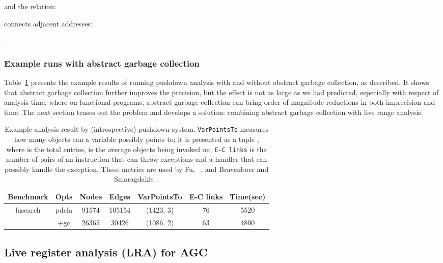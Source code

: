   and the relation:
  
  connects adjacent addresses: 
 
  .

  
\subsubsection{Example runs with abstract garbage collection}



Table~\ref{tbl:to-lead-lra} presents the example results of running pushdown analysis with and without abstract garbage collection,
as described.
It shows that abstract garbage collection further improves the precision, but the effect  is not as large as we had predicted,
especially with respect of analysis time, where on functional programs, abstract garbage collection can bring order-of-magnitude 
reductions in both  imprecision and time.
The next section teases out the problem and develops a solution: combining abstract garbage collection 
with live range analysis.


\begin{table}
    \begin{tabular}{ c | c | c | c | c | c | c }
    \textbf{Benchmark} & \textbf{Opts} & \textbf{Nodes} & \textbf{Edges} &  \textbf{VarPointsTo} & \textbf{E-C links} & \textbf{Time(sec)} \\ \hline 
          \multirow{2}{*}{lusearch} & pdcfa & 91574  & 105154  &  (1423, 3) &  76  &  5520 
          \\ & +gc  & 26365  & 30426  &  (1086, 2) &  63 & 4800 
         \\
     \hline
    \end{tabular}    
     \caption{Example analysis result by (introspective) pushdown system.
     {\tt{VarPointsTo}} measures how many objects can a variable possibly points to; 
     it is   presented as a tuple , where  is the total entries,  is the average 
         objects being invoked on;
     {\tt{E-C links}} is the number of pairs of  an instruction that can throw exceptions and a handler that can possibly handle the exception.
     These metrics are used by Fu, \etal~\cite{Fu:2005:rubust-java-server-apps}, and Bravenboer and
     Smaragdakis~\cite{Bravenboer:2009:Exceptions}.
     }
     \label{tbl:to-lead-lra}
\end{table}




\subsection{Live register analysis (LRA) for AGC} \label{subsec:lra}

